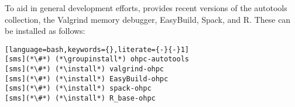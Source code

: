 To aid in general development efforts, \OHPC{} provides recent versions of the \GNU{}
autotools collection, the Valgrind memory debugger, EasyBuild, Spack, and R. These can be installed as follows:

\begin{lstlisting}[language=bash,keywords={},literate={-}{-}1]
[sms](*\#*) (*\groupinstall*) ohpc-autotools
[sms](*\#*) (*\install*) valgrind-ohpc
[sms](*\#*) (*\install*) EasyBuild-ohpc
[sms](*\#*) (*\install*) spack-ohpc
[sms](*\#*) (*\install*) R_base-ohpc            
\end{lstlisting}
